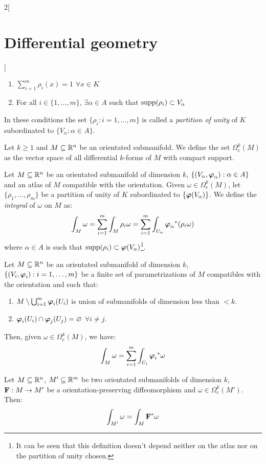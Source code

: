 \documentclass[../../../main.tex]{subfiles}
\begin{document}
\begin{multicols}{2}[\section{Differential geometry}]
\begin{proposition}
    \begin{enumerate}
      \item $\sum_{i=1}^m\rho_i(x)=1$ $\forall x\in K$
      \item For all $i\in\{1,\ldots,m\}$, $\exists \alpha\in A$ such that $\operatorname{supp}(\rho_i)\subset V_\alpha$
    \end{enumerate}
    In these conditions the set $\{\rho_i:i=1,\ldots,m\}$ is called a \emph{partition of unity} of $K$ subordinated to $\{V_\alpha:\alpha\in A\}$.
  \end{proposition}
  \begin{definition}
    Let $k\geq 1$ and $M\subseteq\mathbb{R}^n$ be an orientated submanifold. We define the set $\Omega_\text{c}^k(M)$ as the vector space of all differential $k$-forms of $M$ with compact support.
  \end{definition}
  \begin{definition}
    Let $M\subseteq\mathbb{R}^n$ be an orientated submanifold of dimension $k$, $\{(V_\alpha,\boldsymbol{\mathrm{\varphi}}_\alpha):\alpha\in A\}$ and an atlas of $M$ compatible with the orientation. Given $\omega\in\Omega_\text{c}^k(M)$, let $\{\rho_1,\ldots,\rho_m\}$ be a partition of unity of $K$ subordinated to $\{\boldsymbol{\mathrm{\varphi}}(V_\alpha)\}$. We define the \emph{integral} of $\omega$ on $M$ as:
    $$\int_M\omega=\sum_{i= 1}^m\int_M\rho_i\omega=\sum_{i= 1}^m\int_{U_\alpha}{\boldsymbol{\mathrm{\varphi}}_\alpha}^*(\rho_i\omega)$$
    where $\alpha\in A$ is such that $\operatorname{supp}(\rho_i)\subset \boldsymbol{\mathrm{\varphi}}(V_\alpha)$\footnote{It can be seen that this definition doesn't depend neither on the atlas nor on the partition of unity chosen.}.
  \end{definition}
  \begin{proposition}
    Let $M\subseteq\mathbb{R}^n$ be an orientated submanifold of dimension $k$, $\{(V_i,\boldsymbol{\mathrm{\varphi}}_i):i=1,\ldots,m\}$ be a finite set of parametrizations of $M$ compatibles with the orientation and such that:
    \begin{enumerate}
      \item $M\setminus\bigcup_{i= 1}^m\boldsymbol{\mathrm{\varphi}}_i(U_i)$ is union of submanifolds of dimension less than $<k$.
      \item $\boldsymbol{\mathrm{\varphi}}_i(U_i)\cap\boldsymbol{\mathrm{\varphi}}_j(U_j)=\varnothing$ $\forall i\ne j$.
    \end{enumerate}
    Then, given $\omega\in \Omega_\text{c}^k(M)$, we have: $$\int_M\omega=\sum_{i= 1}^m\int_{U_i}{\boldsymbol{\mathrm{\varphi}}_i}^*\omega$$
  \end{proposition}
  \begin{theorem}
    Let $M\subseteq\mathbb{R}^n$, $M'\subseteq \mathbb{R}^m$ be two orientated submanifolds of dimension $k$, $\boldsymbol{\mathrm{F}}:M\rightarrow M'$ be a orientation-preserving diffeomorphism and $\omega\in \Omega_\text{c}^k(M')$. Then: $$\int_{M'}\omega=\int_M\boldsymbol{\mathrm{F}}^*\omega$$
  \end{theorem}

\end{multicols}
\end{document}
